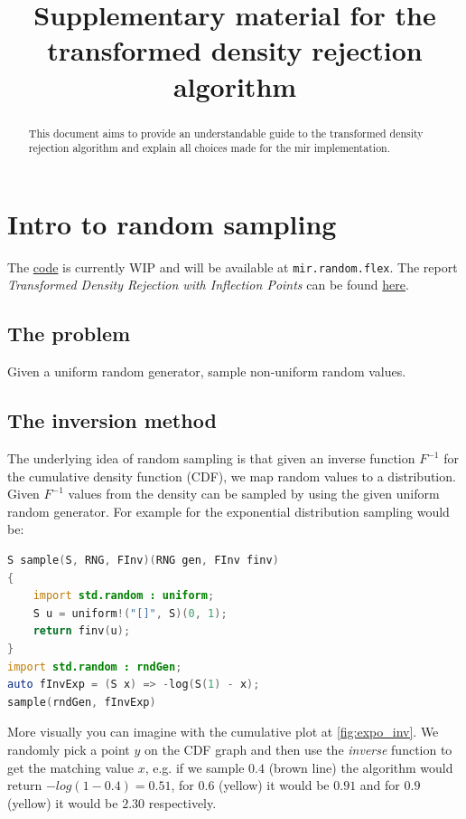 \documentclass[]{article}
\title{Supplementary material for the transformed density rejection algorithm}
\author{}
\begin{document}
\maketitle

\begin{abstract}
This document aims to provide an understandable guide to the transformed density rejection algorithm and explain all choices made for the mir implementation.
\end{abstract}

\section{Intro to random sampling}

The \href{https://github.com/libmir/mir/pull/240}{code} is currently WIP and will be available at \texttt{mir.random.flex}. The report \textit{Transformed Density Rejection with Inflection Points} can be found  \href{http://epub.wu.ac.at/3158/1/techreport-110.pdf}{here}.

\subsection{The problem}

Given a uniform random generator, sample non-uniform random values.

\subsection{The inversion method}

The underlying idea of random sampling is that given an inverse function $F^{-1}$ for the cumulative density function (CDF), we map random values to a distribution. Given $F^{-1}$ values from the density can be sampled by using the given uniform random generator.
For example for the exponential distribution sampling would be:

\begin{lstlisting}[language=D]
S sample(S, RNG, FInv)(RNG gen, FInv finv)
{
    import std.random : uniform;
    S u = uniform!("[]", S)(0, 1);
    return finv(u);
}
import std.random : rndGen;
auto fInvExp = (S x) => -log(S(1) - x);
sample(rndGen, fInvExp)
\end{lstlisting}

More visually you can imagine with the cumulative plot at \autoref{fig:expo_inv}.
We randomly pick a point $y$ on the CDF graph and then use the \textit{inverse}
function to get the matching value $x$, e.g. if we sample $0.4$ (brown line) the algorithm
would return $-log(1 - 0.4) = 0.51$, for $0.6$ (yellow) it would be $0.91$ and for
$0.9$ (yellow) it would be $2.30$ respectively.
\end{document}
